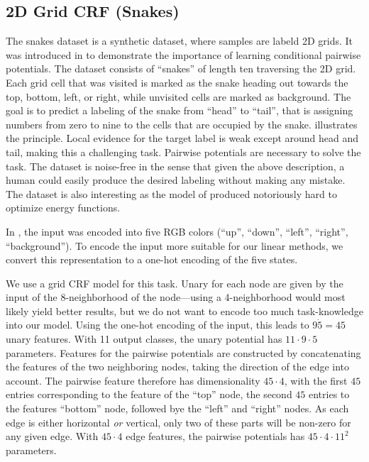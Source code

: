 \subsection{2D Grid CRF (Snakes)}
The snakes dataset is a synthetic dataset, where samples are labeld 2D grids.
It was introduced in \citet{nowozin2011decision} to demonstrate the importance
of learning conditional pairwise potentials. The dataset consists of ``snakes''
of length ten traversing the 2D grid. Each grid cell that was visited is marked
as the snake heading out towards the top, bottom, left, or right, while
unvisited cells are marked as background.  The goal is to predict a labeling of
the snake from ``head'' to ``tail'', that is assigning numbers from zero to
nine to the cells that are occupied by the snake.   illustrates the
principle.
Local evidence for the target label is weak except
around head and tail, making this a challenging task. Pairwise potentials are necessary to solve the
task. The dataset is noise-free in the sense that given the above description, a
human could easily produce the desired labeling without making any mistake.
The dataset is also interesting as the model of \citet{nowozin2011decision} produced
notoriously hard to optimize energy functions.

In \citet{nowozin2011decision}, the input was encoded into five RGB colors
(``up'', ``down'', ``left'', ``right'', ``background'').  To encode the input
more suitable for our linear methods, we convert this representation to a
one-hot encoding of the five states.

We use a grid CRF model for this task. Unary for each node are given by the
input of the 8-neighborhood of the node---using a 4-neighborhood would most
likely yield better results, but we do not want to encode too much
task-knowledge into our model.
Using the one-hot encoding of the input, this leads to $9 \dot 5 = 45$ unary features.
With 11 output classes, the unary potential has $11 \cdot 9 \cdot 5$ parameters.
Features for the pairwise potentials are constructed by concatenating the features
of the two neighboring nodes, taking the direction of the edge into account.
The pairwise feature therefore has dimensionality $45 \cdot 4$, with the first
$45$ entries corresponding to the feature of the ``top'' node, the second $45$
entries to the features ``bottom'' node, followed bye the ``left'' and
``right'' nodes. As each edge is either horizontal \emph{or} vertical, only two
of these parts will be non-zero for any given edge.  With $45 \cdot 4$ edge
features, the pairwise potentials has $45 \cdot 4 \cdot 11^2$ parameters.


